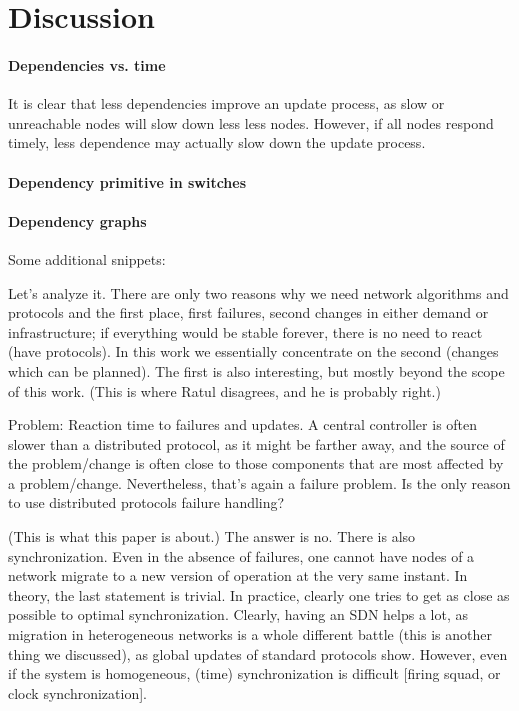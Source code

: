\section{Discussion}
\label{sec:discussion}

\paragraph{Dependencies vs. time} It is clear that less dependencies improve an update process, as slow or unreachable nodes will slow down less less nodes. However, if all nodes respond timely, less dependence may actually slow down the update process. 

\paragraph{Dependency primitive in switches}

\paragraph{Dependency graphs}


Some additional snippets:

Let’s analyze it. There are only two reasons why we need network algorithms and protocols and the first place, first failures, second changes in either demand or infrastructure; if everything would be stable forever, there is no need to react (have protocols). In this work we essentially concentrate on the second (changes which can be planned). The first is also interesting, but mostly beyond the scope of this work. (This is where Ratul disagrees, and he is probably right.)

Problem: Reaction time to failures and updates. A central controller is often slower than a distributed protocol, as it might be farther away, and the source of the problem/change is often close to those components that are most affected by a problem/change. Nevertheless, that’s again a failure problem. Is the only reason to use distributed protocols failure handling?

(This is what this paper is about.) The answer is no. There is also synchronization. Even in the absence of failures, one cannot have nodes of a network migrate to a new version of operation at the very same instant. In theory, the last statement is trivial. In practice, clearly one tries to get as close as possible to optimal synchronization. Clearly, having an SDN helps a lot, as migration in heterogeneous networks is a whole different battle (this is another thing we discussed), as global updates of standard protocols show. However, even if the system is homogeneous, (time) synchronization is difficult [firing squad, or clock synchronization].

